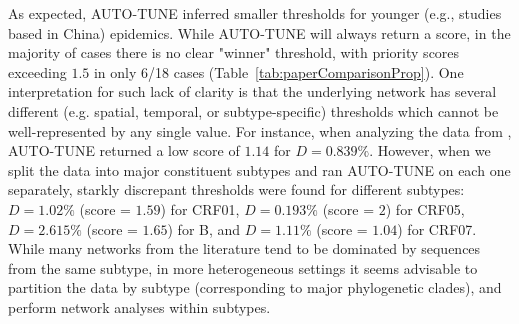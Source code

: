 \documentclass[utf8]{FrontiersinHarvard} %
\begin{document}
As expected, AUTO-TUNE inferred smaller thresholds for younger (e.g., studies
based in China) epidemics. While AUTO-TUNE will always return a score, in the
majority of cases there is no clear "winner" threshold, with priority scores
exceeding $1.5$ in only 6/18 cases (Table~\ref{tab:paperComparisonProp}). One
interpretation for such lack of clarity is that the underlying network has
several different (e.g. spatial, temporal, or subtype-specific) thresholds
which cannot be well-represented by any single value. For instance, when
analyzing the data from \citet{Yan:2021aa}, AUTO-TUNE returned a low score of
$1.14$ for $D=0.839\%$. However, when we split the data into major constituent
subtypes and ran AUTO-TUNE on each one separately, starkly discrepant
thresholds were found for different subtypes: $D=1.02\%$ (score = $1.59$) for
CRF01, $D=0.193\%$ (score = $2$) for CRF05, $D=2.615\%$ (score = $1.65$) for B,
and $D=1.11\%$ (score = $1.04$) for CRF07. While many networks from the
literature tend to be dominated by sequences from the same subtype, in more
heterogeneous settings it seems advisable to partition the data by subtype
(corresponding to major phylogenetic clades), and perform network analyses
within subtypes.
\end{document}
